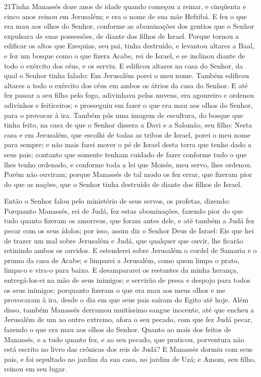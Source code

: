 \medskip

\lettrine{21} Tinha Manassés doze anos de idade quando começou
a reinar, e cinqüenta e cinco anos reinou em Jerusalém; e era o nome
de sua mãe Hefzibá. E fez o que era mau aos olhos do Senhor,
conforme as abominações dos gentios que o Senhor expulsara de suas
possessões, de diante dos filhos de Israel. Porque tornou a
edificar os altos que Ezequias, seu pai, tinha destruído, e levantou
altares a Baal, e fez um bosque como o que fizera Acabe, rei de
Israel, e se inclinou diante de todo o exército dos céus, e os
serviu. E edificou altares na casa do Senhor, da qual o Senhor
tinha falado: Em Jerusalém porei o meu nome. Também edificou
altares a todo o exército dos céus em ambos os átrios da casa do
Senhor. E até fez passar a seu filho pelo fogo, adivinhava pelas
nuvens, era agoureiro e ordenou adivinhos e feiticeiros; e
prosseguiu em fazer o que era mau aos olhos do Senhor, para o
provocar à ira. Também pôs uma imagem de escultura, do bosque
que tinha feito, na casa de que o Senhor dissera a Davi e a Salomão,
seu filho: Nesta casa e em Jerusalém, que escolhi de todas as tribos
de Israel, porei o meu nome para sempre; e não mais farei mover
o pé de Israel desta terra que tenho dado a seus pais; contanto que
somente tenham cuidado de fazer conforme tudo o que lhes tenho
ordenado, e conforme toda a lei que Moisés, meu servo, lhes ordenou.
Porém não ouviram; porque Manassés de tal modo os fez errar, que
fizeram pior do que as nações, que o Senhor tinha destruído de
diante dos filhos de Israel.

Então o Senhor falou pelo ministério de seus servos, os profetas,
dizendo: Porquanto Manassés, rei de Judá, fez estas
abominações, fazendo pior do que tudo quanto fizeram os amorreus,
que foram antes dele, e até também a Judá fez pecar com os seus
ídolos; por isso, assim diz o Senhor Deus de Israel: Eis que
hei de trazer um mal sobre Jerusalém e Judá, que qualquer que ouvir,
lhe ficarão retinindo ambos os ouvidos. E estenderei sobre
Jerusalém o cordel de Samaria e o prumo da casa de Acabe; e limparei
a Jerusalém, como quem limpa o prato, limpa-o e vira-o para baixo.
E desampararei os restantes da minha herança, entregá-los-ei
na mão de seus inimigos; e servirão de presa e despojo para todos os
seus inimigos; porquanto fizeram o que era mau aos meus olhos
e me provocaram à ira, desde o dia em que seus pais saíram do Egito
até hoje. Além disso, também Manassés derramou muitíssimo
sangue inocente, até que encheu a Jerusalém de um ao outro extremo,
afora o seu pecado, com que fez Judá pecar, fazendo o que era mau
aos olhos do Senhor. Quanto ao mais dos feitos de Manassés, e
a tudo quanto fez, e ao seu pecado, que praticou, porventura não
está escrito no livro das crônicas dos reis de Judá? E
Manassés dormiu com seus pais, e foi sepultado no jardim da sua
casa, no jardim de Uzá; e Amom, seu filho, reinou em seu lugar.

